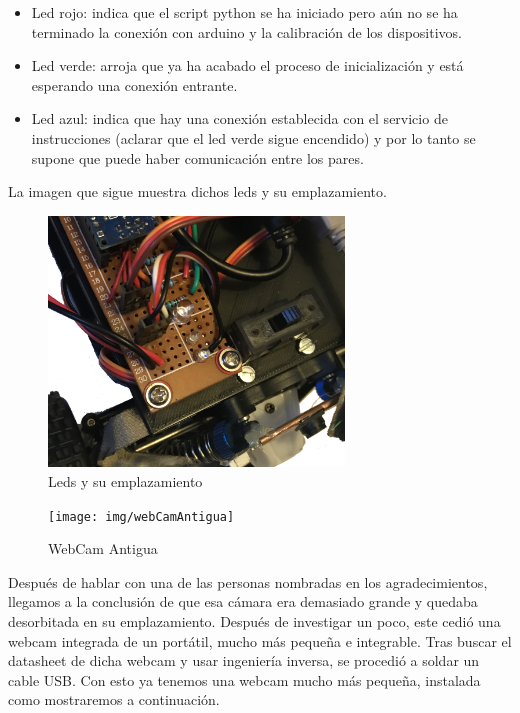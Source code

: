 \documentclass{pclass}
\begin{document}
\begin{itemize}
\begin{itemize}
	\item Led rojo: indica que el script python se ha iniciado pero aún no se ha terminado la conexión con arduino y la calibración de los dispositivos.
	\item Led verde: arroja que ya ha acabado el proceso de inicialización y está esperando una conexión entrante.
	\item Led azul: indica que hay una conexión establecida con el servicio de instrucciones (aclarar que el led verde sigue encendido) y por lo tanto se supone que puede haber comunicación entre los pares.
	
\end{itemize}

La imagen que sigue muestra dichos leds y su emplazamiento.

\begin{figure}[H]
	\centering
	\includegraphics[width=0.7\textwidth]{img/leds}
	\caption{Leds y su emplazamiento}
	\label{fig:leds}
\end{figure}



\begin{figure}[H]
	\centering
	\texttt{[image: img/webCamAntigua]}
	\caption{WebCam Antigua}
	\label{fig:webcamvieja}
\end{figure}

Después de hablar con una de las personas nombradas en los agradecimientos, llegamos a la conclusión de que esa cámara era demasiado grande y quedaba desorbitada en su emplazamiento. Después de investigar un poco, este cedió una webcam integrada de un portátil, mucho más pequeña e integrable. Tras buscar el datasheet de dicha webcam y usar ingeniería inversa, se procedió a soldar un cable USB. Con esto ya tenemos una webcam mucho más pequeña, instalada como mostraremos a continuación.


\end{itemize}
\end{document}
